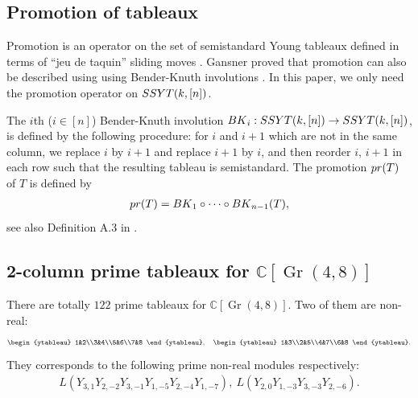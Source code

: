 \documentclass[12pt, reqno]{amsart}
\theoremstyle{plain}
\theoremstyle{definition}
\numberwithin{equation}{section}
\newcommand{\CC}{{\mathbb {C}}}
\newcommand{\SSYT}{{\rm SSYT}}
\DeclareMathOperator{\Gr}{Gr}
\newcommand\scalemath[2]{\scalebox{#1}{\mbox{\ensuremath{\displaystyle #2}}}}
\begin{document}
\subsection{Promotion of tableaux}

Promotion is an operator on the set of semistandard Young tableaux defined in terms of ``jeu de taquin'' sliding moves \cite{Sch63, Sch72, Sch77}. Gansner \cite{Ga80} proved that promotion can also be described using using Bender-Knuth involutions \cite{BK}. 
In this paper, we only need the promotion operator on $\SSYT(k, [n])$. 

The $i$th ($i \in [n]$) Bender-Knuth involution ${\rm BK}_i: \SSYT(k, [n]) \to \SSYT(k, [n])$, is defined by the following procedure: for $i$ and $i+1$ which are not in the same column, we replace $i$ by $i+1$ and replace $i+1$ by $i$, and then reorder $i$, $i+1$ in each row such that the resulting tableau is semistandard. The promotion ${\rm pr}(T)$ of $T$ is defined by 
\begin{align*}
{\rm pr}(T) = {\rm BK}_1 \circ \cdots \circ {\rm BK}_{n-1}(T),    
\end{align*}
see also Definition A.3 in \cite{Hop20}.  

\subsection{\texorpdfstring{2-column prime tableaux for $\CC[\Gr(4,8)]$}{2-column prime tableaux for CC[Gr(4,8)]}}


There are totally $122$ prime tableaux for $\CC[\Gr(4,8)]$. Two of them are non-real:
\begin{align*}
\scalemath{0.7}{ \begin{ytableau}
 1&2\\3&4\\5&6\\7&8
\end{ytableau}, \quad \begin{ytableau}
1&3\\2&5\\4&7\\6&8
\end{ytableau}. }
\end{align*}
They corresponds to the following prime non-real modules respectively:
\begin{align*}
L(Y_{3, 1}Y_{2, -2}Y_{3, -1}Y_{1, -5}Y_{2, -4}Y_{1, -7}), \ L(Y_{2, 0}Y_{1, -3}Y_{3, -3}Y_{2, -6}).
\end{align*}
\end{document}
